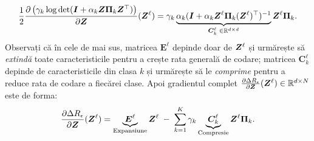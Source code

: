 \documentclass[../../book-main_ro.tex]{subfiles}
\begin{document}
\begin{equation}\label{eqn:compress-directions}
\frac{1}{2}\frac{\partial \left( \gamma_{k}  \log \det (\bm{I} + \alpha_{k} \bm{Z} \bm \Pi_k \bm{Z}^{\top} )  \right)}{\partial \bm Z}(\bm{Z}^\ell) = \gamma_{k}  \underbrace{ \alpha_{k}  (\bm{I} +  \alpha_{k} \bm{Z}^\ell \bm \Pi_k (\bm{Z}^\ell)^{\top})^{-1}}_{\bm C^{\ell}_k \; \in \mathbb{R}^{d\times d}} \bm{Z}^{\ell} \bm \Pi_k.
\end{equation}
Observați că în cele de mai sus, matricea $\bm E^{\ell}$ depinde doar de $\bm{Z}^{\ell}$ și urmărește să {\em extindă} toate caracteristicile pentru a crește rata generală de codare; matricea $\bm C^{\ell}_{k}$ depinde de caracteristicile din clasa $k$ și urmărește să le {\em comprime} pentru a reduce rata de codare a fiecărei clase. 
Apoi gradientul complet $\frac{\partial \Delta R_{\epsilon}}{\partial \bm Z}(\bm{Z}^\ell) \in \mathbb{R}^{d\times N}$ este de forma:
\begin{equation}
\frac{\partial \Delta R_{\epsilon}}{\partial \bm Z}(\bm{Z}^\ell)  = \underbrace{\bm E^{\ell}}_{\text{Expansiune}} \bm{Z}^{\ell} \;-\; \sum_{k=1}^K \gamma_{k} \underbrace{\bm C_{k}^{\ell}}_{\text{Compresie}}  \bm{Z}^{\ell} \bm{\Pi}_k.
\label{eqn:DR-gradient}
\end{equation}
\end{document}
